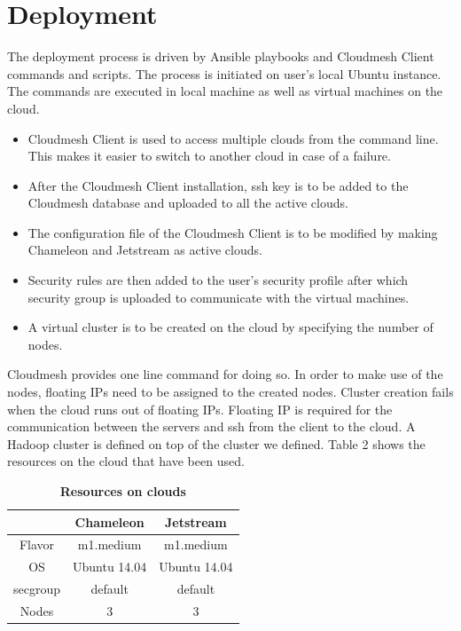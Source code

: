 \documentclass[9pt,twocolumn,twoside]{../../styles/osajnl}
\begin{document}
\section{Deployment} 


The deployment process is driven by Ansible playbooks and Cloudmesh
Client commands and scripts. The process is initiated on user’s local
Ubuntu instance. The commands are executed in local machine as well as
virtual machines on the cloud.

\begin{itemize}

\item Cloudmesh Client is used to access multiple clouds from the
  command line. This makes it easier to switch to another cloud in
  case of a failure. 
  
  
\item After the Cloudmesh Client installation, ssh key is to be added
  to the Cloudmesh database and uploaded to all the active clouds.

\item The configuration file of the Cloudmesh Client is to be modified
  by making Chameleon and Jetstream as active clouds.

\item Security rules are then added to the user’s security profile
  after which security group is uploaded to communicate with the
  virtual machines.

\item A virtual cluster is to be created on the cloud by specifying the number of nodes. 
\end{itemize}

Cloudmesh provides one line command for doing so. In order to make use
of the nodes, floating IPs need to be assigned to the created
nodes. Cluster creation fails when the cloud runs out of floating
IPs. Floating IP is required for the communication between the servers
and ssh from the client to the cloud. A Hadoop cluster is defined on
top of the cluster we defined. Table 2 shows the resources on the
cloud that have been used.


\begin{table}[htbp]
\centering
\caption{\bf Resources on clouds}

 \begin{tabular}{|c | c | c|} 
 \hline
&  Chameleon & Jetstream \\ [0.5ex] 
 \hline\hline
    
Flavor &	m1.medium &	m1.medium \\
 \hline
OS&	Ubuntu 14.04 &	Ubuntu 14.04 \\ 
 \hline
secgroup &	default &	default \\ 
 \hline
Nodes &	3 &	3 \\ [1ex] 
 \hline

\end{tabular}
  \label{tab:fault-tolerance}
\end{table}
\end{document}

